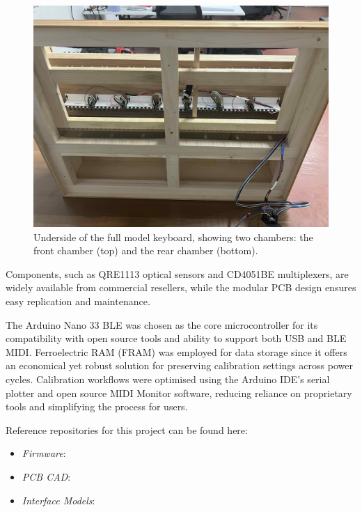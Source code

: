 \begin{figure}[t]
  \centering
  \includegraphics[width=\linewidth]{src/images/49-key-bottom-sensors-no-keys.jpg} 
  \caption{Underside of the full model keyboard, showing two chambers: the front chamber (top) and the rear chamber (bottom).} 
  \Description{} 
  \label{fig:49-key-bottom}
\end{figure}

Components, such as QRE1113 optical sensors and CD4051BE multiplexers, are widely available from commercial resellers, while the modular PCB design ensures easy replication and maintenance.

The Arduino Nano 33 BLE was chosen as the core microcontroller for its compatibility with open source tools and ability to support both USB and BLE MIDI. Ferroelectric RAM (FRAM) was employed for data storage since it offers an economical yet robust solution for preserving calibration settings across power cycles. Calibration workflows were optimised using the Arduino IDE’s serial plotter and open source MIDI Monitor software, reducing reliance on proprietary tools and simplifying the process for users. 

Reference repositories for this project can be found here:
\begin{anonsuppress}
    \begin{itemize}
        \item 
        \emph{Firmware}: 
        \item 
        \emph{PCB CAD}: 
        \item 
        \emph{Interface Models}: 
    \end{itemize}
\end{anonsuppress}



